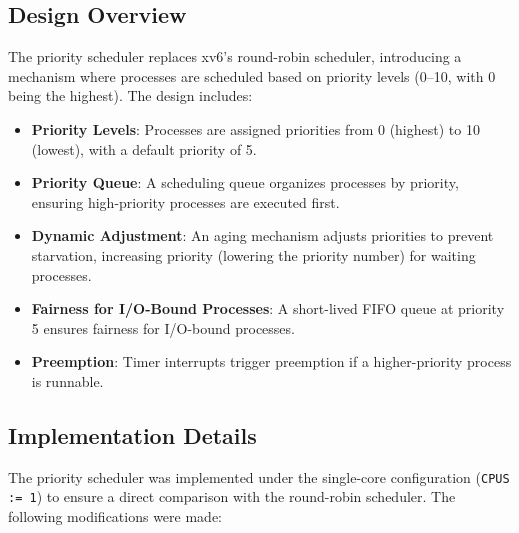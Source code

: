 \documentclass[12pt]{article}
\begin{document}
\subsection{Design Overview}
\label{subsec:priority-design}

The priority scheduler replaces xv6’s round-robin scheduler, introducing a mechanism where processes are scheduled based on priority levels (0–10, with 0 being the highest). The design includes:

\begin{itemize}
  \item \textbf{Priority Levels}: Processes are assigned priorities from 0 (highest) to 10 (lowest), with a default priority of 5.
  \item \textbf{Priority Queue}: A scheduling queue organizes processes by priority, ensuring high-priority processes are executed first.
  \item \textbf{Dynamic Adjustment}: An aging mechanism adjusts priorities to prevent starvation, increasing priority (lowering the priority number) for waiting processes.
  \item \textbf{Fairness for I/O-Bound Processes}: A short-lived FIFO queue at priority 5 ensures fairness for I/O-bound processes.
  \item \textbf{Preemption}: Timer interrupts trigger preemption if a higher-priority process is runnable.
\end{itemize}

\subsection{Implementation Details}
\label{subsec:priority-implementation}

The priority scheduler was implemented under the single-core configuration (\texttt{CPUS := 1}) to ensure a direct comparison with the round-robin scheduler. The following modifications were made:
\end{document}
